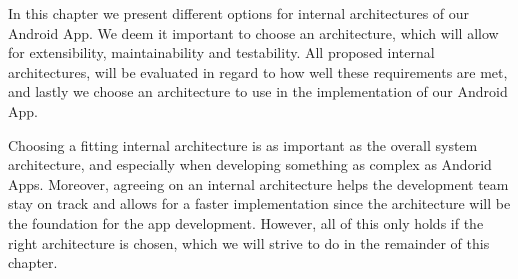 In this chapter we present different options for internal architectures of our Android App.
We deem it important to choose an architecture, which will allow for extensibility, maintainability and testability.
All proposed internal architectures, will be evaluated in regard to how well these requirements are met, and lastly we choose an architecture to use in the implementation of our Android App.

Choosing a fitting internal architecture is as important as the overall system architecture, and especially when developing something as complex as Andorid Apps.
Moreover, agreeing on an internal architecture helps the development team stay on track and allows for a faster implementation since the architecture will be the foundation for the app development.
However, all of this only holds if the right architecture is chosen, which we will strive to do in the remainder of this chapter.
